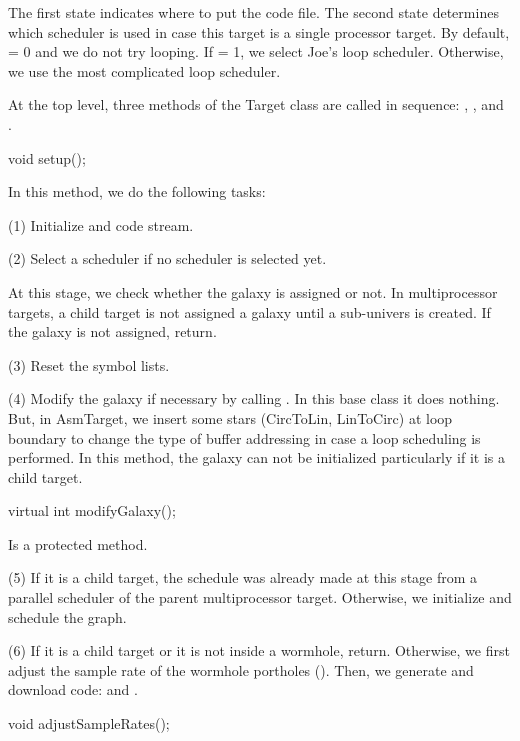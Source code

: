 The first state indicates where to put the code file. The second state
determines which scheduler is used in case this target is a single
processor target. By default,  = 0 and we do not
try looping. If  = 1, we select Joe's loop scheduler.
Otherwise, we use the most complicated loop scheduler.

At the top level, three methods of the Target class are called in sequence:
, , and . 

\begin{example}
void setup();
\end{example}

In this method, we do the following tasks:

(1) Initialize  and  code stream.

(2) Select a scheduler if no scheduler is selected yet.

At this stage, we check whether the galaxy is assigned or not. In
multiprocessor targets, a child target is not assigned a galaxy until
a sub-univers is created. If the galaxy is not assigned, return.

(3) Reset the symbol lists.

(4) Modify the galaxy if necessary by calling . In this
base class it does nothing. But, in AsmTarget, we insert some stars
(CircToLin, LinToCirc) at loop boundary to change the type of buffer
addressing in case a loop scheduling is performed. In this method,
the galaxy can not be initialized particularly if it is a child target.

\begin{example}
virtual int modifyGalaxy();
\end{example}

Is a protected method.

(5) If it is a child target, the schedule was already made at this stage
from a parallel scheduler of the parent multiprocessor target. Otherwise,
we initialize and schedule the graph.

(6) If it is a child target or it is not inside a wormhole, return.
Otherwise, we first adjust the sample rate of the wormhole portholes
(). Then, we generate and download code:
 and .

\begin{example}
void adjustSampleRates();
\end{example}

